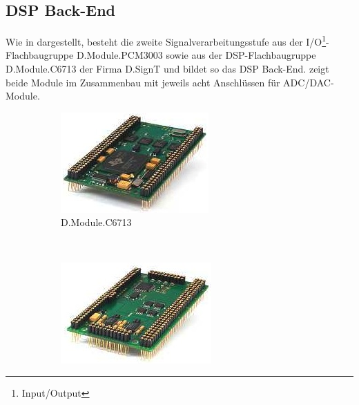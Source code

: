 \subsection{DSP Back-End}
Wie in  dargestellt, besteht die zweite Signalverarbeitungsstufe aus der I/O\footnote{Input/Output}-Flachbaugruppe D.Module.PCM3003 sowie aus der DSP-Flachbaugruppe D.Module.C6713 der Firma D.SignT und bildet so das DSP Back-End.  zeigt beide Module im Zusammenbau mit jeweils acht Anschlüssen für ADC/DAC-Module.


\begin{figure}
        \centering
        \begin{subfigure}[b]{0.48\textwidth}
                \centering
                \includegraphics[width=\textwidth]{grafiken/03_Realisierung/DSP6713}
                \caption{D.Module.C6713}
                \label{fig:D.Module.C6713}
        \end{subfigure}
        ~ %
        \begin{subfigure}[b]{0.48\textwidth}
                \centering
                \includegraphics[width=\textwidth]{grafiken/03_Realisierung/PCM3003}

\end{subfigure}
\end{figure}
